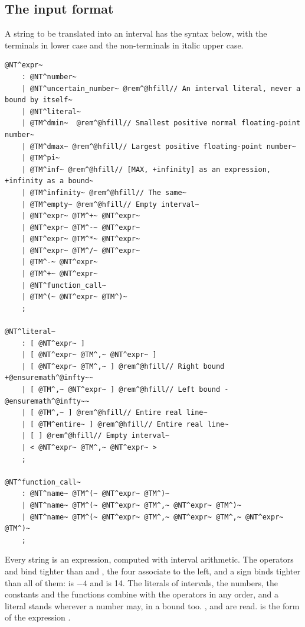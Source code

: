 \subsection{The input format}\label{sec:input-format}

A string to be translated into an interval has the syntax below, with the
terminals in lower case and the non-terminals in italic upper case.
%

\begin{Verbatim}[commandchars=\@\^\~,fontsize=\small]
@NT^expr~
	: @NT^number~
	| @NT^uncertain_number~ @rem^@hfill// An interval literal, never a bound by itself~
	| @NT^literal~
	| @TM^dmin~  @rem^@hfill// Smallest positive normal floating-point number~
	| @TM^dmax~ @rem^@hfill// Largest positive floating-point number~
	| @TM^pi~
	| @TM^inf~ @rem^@hfill// [MAX, +infinity] as an expression, +infinity as a bound~
	| @TM^infinity~ @rem^@hfill// The same~
	| @TM^empty~ @rem^@hfill// Empty interval~
	| @NT^expr~ @TM^+~ @NT^expr~
	| @NT^expr~ @TM^-~ @NT^expr~
	| @NT^expr~ @TM^*~ @NT^expr~
	| @NT^expr~ @TM^/~ @NT^expr~
	| @TM^-~ @NT^expr~
	| @TM^+~ @NT^expr~
	| @NT^function_call~
	| @TM^(~ @NT^expr~ @TM^)~
	;

@NT^literal~
	: [ @NT^expr~ ]
	| [ @NT^expr~ @TM^,~ @NT^expr~ ]
	| [ @NT^expr~ @TM^,~ ] @rem^@hfill// Right bound +@ensuremath^@infty~~
	| [ @TM^,~ @NT^expr~ ] @rem^@hfill// Left bound -@ensuremath^@infty~~
	| [ @TM^,~ ] @rem^@hfill// Entire real line~
	| [ @TM^entire~ ] @rem^@hfill// Entire real line~
	| [ ] @rem^@hfill// Empty interval~
	| < @NT^expr~ @TM^,~ @NT^expr~ >
	;

@NT^function_call~
	: @NT^name~ @TM^(~ @NT^expr~ @TM^)~
	| @NT^name~ @TM^(~ @NT^expr~ @TM^,~ @NT^expr~ @TM^)~
	| @NT^name~ @TM^(~ @NT^expr~ @TM^,~ @NT^expr~ @TM^,~ @NT^expr~ @TM^)~
	;
\end{Verbatim}

\noindent
Every string is an expression, computed with interval arithmetic. The
operators \TM{*} and \TM{/} bind tighter than \TM{+} and \TM{-}, the four
associate to the left, and a sign binds tighter than all of them:
 is $-4$ and  is 14. The
literals of intervals, the numbers, the constants and the functions combine
with the operators in any order, and a literal stands wherever a number may,
in a bound too.\newinvfive{} ,  and
\code{[cos([0,1]), 2]} are read. \code{[empty]} is the form
\code{[\NT{expr}]} of the expression .

